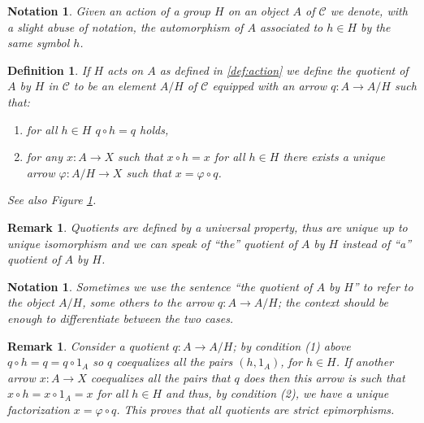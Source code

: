 \documentclass[italian, 12pt, reqno]{article}
\theoremstyle{myteo}
\newtheorem{definition}[theorem]{Definition}
\newtheorem{remark}[theorem]{Remark}
\newtheorem{notation}[theorem]{Notation}
\numberwithin{equation}{section}
\newcommand{\cat}[1]{\mathscr{#1}}
\newcommand{\fun}[3]{#1\colon#2\to #3}
\begin{document}
\begin{notation}
  \label{not:action}
  Given an action of a group \(H\) on an object \(A\) of \(\cat{C}\) we denote, with a slight abuse of notation, the automorphism of \(A\) associated to \(h\in H\) by the same symbol \(h\).
\end{notation}

\begin{definition}
  \label{def:quotient}
  If \(H\) acts on \(A\) as defined in \ref{def:action} we define the quotient of \(A\) by \(H\) in \(\cat{C}\) to be an element \(A/H\) of \(\cat{C}\) equipped with an arrow \(\fun{q}{A}{A/H}\) such that:
  \begin{enumerate}
  \item for all \(h\in H\) \(q\circ h = q\) holds,
  \item for any \(\fun{x}{A}{X}\) such that \(x\circ h = x\) for all \(h\in H\) there exists a unique arrow \(\fun{\varphi}{A/H}{X}\) such that \(x = \varphi\circ q\).
  \end{enumerate}
  See also Figure \ref{diagram:quotient}.
\end{definition}

\begin{remark}
  \label{rem:uniqueness_of_quotient}
  Quotients are defined by a universal property, thus are unique up to unique isomorphism and we can speak of ``the'' quotient of \(A\) by \(H\) instead of ``a'' quotient of \(A\) by \(H\).
\end{remark}

\begin{notation}
  \label{not:quotient}
  Sometimes we use the sentence ``the quotient of \(A\) by \(H\)'' to refer to the object \(A/H\), some others to the arrow \(\fun{q}{A}{A/H}\); the context should be enough to differentiate between the two cases.
\end{notation}

\begin{figure}[h]
  \begin{center}
  \end{center}
  \caption{}
  \label{diagram:quotient}
\end{figure}

\begin{remark}
  \label{rem:quotient_are_strict_epi}
  Consider a quotient \(\fun{q}{A}{A/H}\); by condition (1) above \(q\circ h = q = q\circ 1_A\) so \(q\) coequalizes all the pairs \((h, 1_A)\), for \(h\in H\).
  If another arrow \(\fun{x}{A}{X}\) coequalizes all the pairs that \(q\) does then this arrow is such that \(x\circ h = x\circ 1_A = x\) for all \(h\in H\) and thus, by condition (2), we have a unique factorization \(x = \varphi\circ q\).
  This proves that all quotients are strict epimorphisms.
\end{remark}
\end{document}
